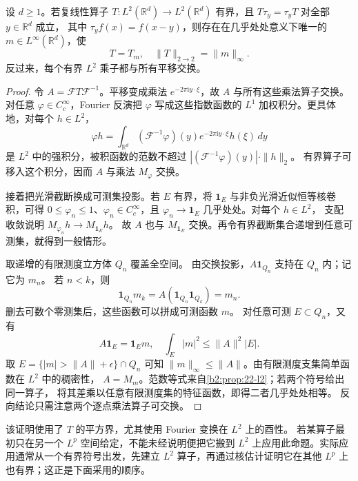 \begin{proposition}\label{b2:prop:22-translation-multiplier}
设 \(d\geq1\)。若复线性算子
\(T:L^2(\mathbb R^d)\to L^2(\mathbb R^d)\) 有界，且
\(T\tau_y=\tau_yT\) 对全部 \(y\in\mathbb R^d\) 成立，
其中 \(\tau_yf(x)=f(x-y)\)，则存在在几乎处处意义下唯一的
\(m\in L^\infty(\mathbb R^d)\)，使
\[
 T=T_m,\quad \|T\|_{2\to2}=\|m\|_\infty.
\]
反过来，每个有界 \(L^2\) 乘子都与所有平移交换。
\end{proposition}
\begin{proof}
令 \(A=\mathcal FT\mathcal F^{-1}\)。平移变成乘法
\(e^{-2\pi\mathrm i y\cdot\xi}\)，故 \(A\) 与所有这些乘法算子交换。
对任意 \(\varphi\in C_c^\infty\)，Fourier 反演把 \(\varphi\) 写成这些指数函数的
\(L^1\) 加权积分。更具体地，对每个 \(h\in L^2\)，
\[
 \varphi h=\int_{\mathbb R^d}
  (\mathcal F^{-1}\varphi)(y)e^{-2\pi\mathrm i y\cdot\xi}h(\xi)\,dy
\]
是 \(L^2\) 中的强积分，被积函数的范数不超过
\(|(\mathcal F^{-1}\varphi)(y)|\cdot\|h\|_2\)。
有界算子可移入这个积分，因而 \(A\) 与乘法 \(M_\varphi\) 交换。

接着把光滑截断换成可测集投影。若 \(E\) 有界，将 \(\mathbf1_E\) 与非负光滑近似恒等核卷积，可得
\(0\leq\varphi_n\leq1\)、\(\varphi_n\in C_c^\infty\)，且
\(\varphi_n\to\mathbf1_E\) 几乎处处。对每个 \(h\in L^2\)，
支配收敛说明 \(M_{\varphi_n}h\to M_{\mathbf1_E}h\)。
故 \(A\) 也与 \(M_{\mathbf1_E}\) 交换。再令有界截断集合递增到任意可测集，就得到一般情形。

取递增的有限测度立方体 \(Q_n\) 覆盖全空间。
由交换投影，\(A\mathbf1_{Q_n}\) 支持在 \(Q_n\) 内；记它为 \(m_n\)。
若 \(n<k\)，则
\[
 \mathbf1_{Q_n}m_k
 =A(\mathbf1_{Q_n}\mathbf1_{Q_k})=m_n.
\]
删去可数个零测集后，这些函数可以拼成可测函数 \(m\)。
对任意可测 \(E\subset Q_n\)，又有
\[
 A\mathbf1_E=\mathbf1_E m,\quad
 \int_E|m|^2\leq\|A\|^2|E|.
\]
取 \(E=\{|m|>\|A\|+\epsilon\}\cap Q_n\) 可知
\(\|m\|_\infty\leq\|A\|\)。由有限测度支集简单函数在 \(L^2\) 中的稠密性，
\(A=M_m\)。范数等式来自\cref{b2:prop:22-l2}；若两个符号给出同一算子，
将其差乘以任意有限测度集的特征函数，即得二者几乎处处相等。
反向结论只需注意两个逐点乘法算子可交换。
\end{proof}

该证明使用了 \(T\) 的平方界，尤其使用 Fourier 变换在 \(L^2\) 上的酉性。
若某算子最初只在另一个 \(L^p\) 空间给定，不能未经说明便把它搬到
\(L^2\) 上应用此命题。实际应用通常从一个有界符号出发，先建立
\(L^2\) 算子，再通过核估计证明它在其他 \(L^p\) 上也有界；这正是下面采用的顺序。
